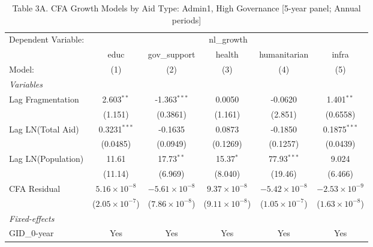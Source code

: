 
\begin{table}[H]
   \caption{Table 3A. CFA Growth Models by Aid Type: Admin1, High Governance [5-year panel; Annual periods]}
   \centering
   \begin{tabular}{lccccc}
      \tabularnewline \midrule \midrule
      Dependent Variable: & \multicolumn{5}{c}{nl\_growth}\\
                         & educ                    & gov\_support            & health                  & humanitarian            & infra \\   
      Model:             & (1)                     & (2)                     & (3)                     & (4)                     & (5)\\  
      \midrule
      \emph{Variables}\\
      Lag Fragmentation  & 2.603$^{**}$            & -1.363$^{***}$          & 0.0050                  & -0.0620                 & 1.401$^{**}$\\   
                         & (1.151)                 & (0.3861)                & (1.161)                 & (2.851)                 & (0.6558)\\   
      Lag LN(Total Aid)  & 0.3231$^{***}$          & -0.1635                 & 0.0873                  & -0.1850                 & 0.1875$^{***}$\\   
                         & (0.0485)                & (0.0949)                & (0.1269)                & (0.1257)                & (0.0439)\\   
      Lag LN(Population) & 11.61                   & 17.73$^{**}$            & 15.37$^{*}$             & 77.93$^{***}$           & 9.024\\   
                         & (11.14)                 & (6.969)                 & (8.040)                 & (19.46)                 & (6.466)\\   
      CFA Residual       & $5.16\times 10^{-8}$    & $-5.61\times 10^{-8}$   & $9.37\times 10^{-8}$    & $-5.42\times 10^{-8}$   & $-2.53\times 10^{-9}$\\    
                         & ($2.05\times 10^{-7}$)  & ($7.86\times 10^{-8}$)  & ($9.11\times 10^{-8}$)  & ($1.05\times 10^{-7}$)  & ($1.63\times 10^{-8}$)\\    
      \midrule
      \emph{Fixed-effects}\\
      GID\_0-year        & Yes                     & Yes                     & Yes                     & Yes                     & Yes\\  

\end{tabular}
\end{table}
